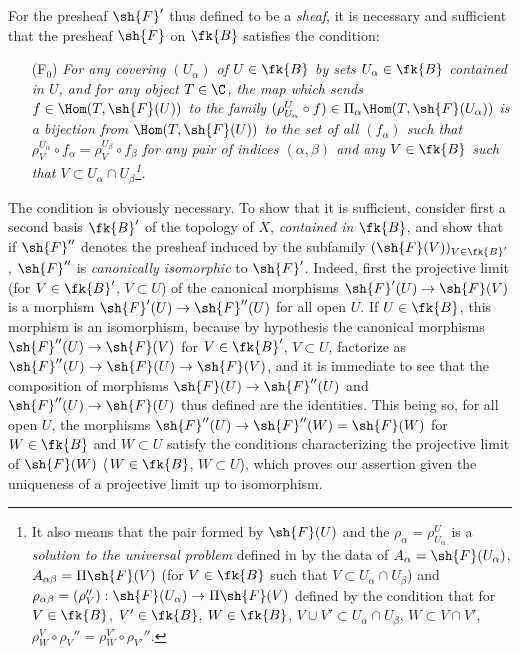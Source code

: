 \begin{env}[3.2.2]
\label{0.3.2.2}
For the presheaf $\sh{F}'$ thus defined to be a \emph{sheaf}, it is necessary
and sufficient that the presheaf $\sh{F}$ on $\fk{B}$ satisfies the
condition:
\begin{enumerate}
  \item[(F$_0$)] \emph{For any covering $(U_\alpha)$ of $U\in\fk{B}$ by sets
        $U_\alpha\in\fk{B}$ contained in $U$, and for any object $T\in\C$,
        the map which sends $f\in\Hom(T,\sh{F}(U))$ to the family
        $(\rho_{U_\alpha}^U\circ f)\in\Pi_\alpha\Hom(T,\sh{F}(U_\alpha))$ is a
        bijection from $\Hom(T,\sh{F}(U))$ to the set of all $(f_\alpha)$ such
        that $\rho_V^{U_\alpha}\circ f_\alpha=\rho_V^{U_\beta}\circ f_\beta$ for
        any pair of indices $(\alpha,\beta)$ and any $V\in\fk{B}$ such
        that $V\subset U_\alpha\cap U_\beta$\footnote{It also means that the
        pair formed by $\sh{F}(U)$ and the $\rho_\alpha=\rho_{U_\alpha}^U$ is a
        \emph{solution to the universal problem} defined in  by
        the data of $A_\alpha=\sh{F}(U_\alpha)$, $A_{\alpha\beta}=\Pi\sh{F}(V)$
        (for $V\in\fk{B}$ such that $V\subset U_\alpha\cap U_\beta$) and
        $\rho_{\alpha\beta}=(\rho_V''):\sh{F}(U_\alpha)\to\Pi\sh{F}(V)$ defined
        by the condition that for $V\in\fk{B}$, $V'\in\fk{B}$,
        $W\in\fk{B}$, $V\cup V'\subset U_\alpha\cap U_\beta$,
        $W\subset V\cap V'$,
        $\rho_W^V\circ\rho_V''=\rho_W^{V'}\circ\rho_{V'}''$.}.}
\end{enumerate}

The condition is obviously necessary. To show that it is sufficient, consider
first a second basis $\fk{B}'$ of the topology of $X$, \emph{contained in}
$\fk{B}$, and show that if $\sh{F}''$ denotes the presheaf induced by the
subfamily $(\sh{F}(V))_{V\in\fk{B}'}$, $\sh{F}''$ is \emph{canonically
isomorphic} to $\sh{F}'$. Indeed, first the projective limit (for
$V\in\fk{B}'$, $V\subset U$) of the canonical morphisms
$\sh{F}'(U)\to\sh{F}(V)$ is a morphism $\sh{F}'(U)\to\sh{F}''(U)$ for all open
$U$. If $U\in\fk{B}$, this morphism is an isomorphism, because by
hypothesis the canonical morphisms $\sh{F}''(U)\to\sh{F}(V)$ for
$V\in\fk{B}'$, $V\subset U$, factorize as
$\sh{F}''(U)\to\sh{F}(U)\to\sh{F}(V)$, and it is immediate to see that the
composition of morphisms $\sh{F}(U)\to\sh{F}''(U)$ and $\sh{F}''(U)\to\sh{F}(U)$
thus defined are the identities. This being so, for all open $U$, the morphisms
$\sh{F}''(U)\to\sh{F}''(W)=\sh{F}(W)$ for $W\in\fk{B}$ and $W\subset U$
satisfy the conditions characterizing the projective limit of $\sh{F}(W)$
($W\in\fk{B}$, $W\subset U$), which proves our assertion given the
uniqueness of a projective limit up to isomorphism.


\end{env}

